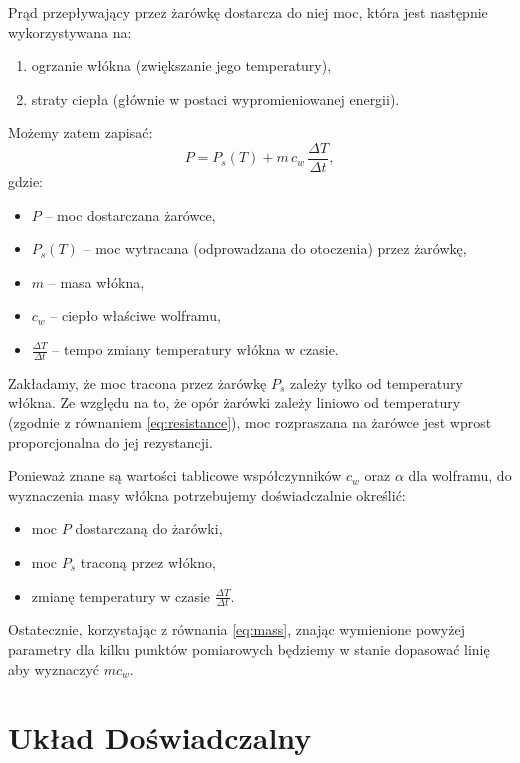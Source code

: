 \documentclass[12pt]{article}
\begin{document}
Prąd przepływający przez żarówkę dostarcza do niej moc, która jest następnie wykorzystywana na:  
\begin{enumerate}
\item ogrzanie włókna (zwiększanie jego temperatury),  
\item straty ciepła (głównie w postaci wypromieniowanej energii).  
\end{enumerate}
Możemy zatem zapisać:
\begin{equation}
    P = P_s(T) + m\,c_w\,\frac{\Delta T}{\Delta t},
    \label{eq:mass}
\end{equation}
gdzie:  
\begin{itemize}
\item $P$ – moc dostarczana żarówce,  
\item $P_s(T)$ – moc wytracana (odprowadzana do otoczenia) przez żarówkę,  
\item $m$ – masa włókna,  
\item $c_w$ – ciepło właściwe wolframu,  
\item $\frac{\Delta T}{\Delta t}$ – tempo zmiany temperatury włókna w czasie.  
\end{itemize}

Zakładamy, że moc tracona przez żarówkę $P_s$ zależy tylko od temperatury włókna. Ze względu na to, że opór żarówki zależy liniowo od temperatury (zgodnie z równaniem \eqref{eq:resistance}), moc rozpraszana na żarówce jest wprost proporcjonalna do jej rezystancji.

Ponieważ znane są wartości tablicowe współczynników $c_w$ oraz $\alpha$ dla wolframu, do wyznaczenia masy włókna potrzebujemy doświadczalnie określić:  
\begin{itemize}
\item moc $P$ dostarczaną do żarówki,  
\item moc $P_s$ traconą przez włókno,  
\item zmianę temperatury w czasie $\frac{\Delta T}{\Delta t}$.  
\end{itemize}
Ostatecznie, korzystając z równania \eqref{eq:mass}, znając wymienione powyżej parametry dla kilku punktów pomiarowych będziemy w stanie dopasować linię aby wyznaczyć $mc_w$.

\section{Układ Doświadczalny}
\end{document}
